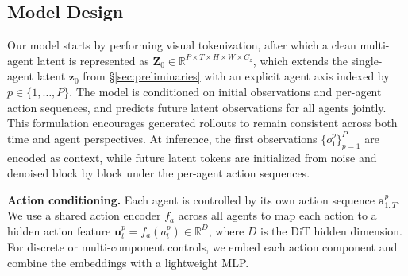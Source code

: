 


\subsection{Model Design}
\label{sec:model-design}

Our model starts by performing visual tokenization, after which a clean multi-agent latent is represented as
$\mathbf{Z}_0\in\mathbb{R}^{P\times T\times H\times W\times C_z}$,
which extends the single-agent latent $\mathbf{z}_0$ from \S\ref{sec:preliminaries} with an explicit agent axis indexed by $p\in\{1,\ldots,P\}$.
The model is conditioned on initial observations and per-agent action sequences, and predicts future latent observations for all agents jointly.
This formulation encourages generated rollouts to remain consistent across both time and agent perspectives.
At inference, the first observations $\{o_1^p\}_{p=1}^P$ are encoded as context, while future latent tokens are initialized from noise and denoised block by block under the per-agent action sequences.


\noindent\textbf{Action conditioning.}
\label{sec:action-conditioning}
Each agent is controlled by its own action sequence $\mathbf{a}^p_{1:T}$.
We use a shared action encoder $f_a$ across all agents to map each action to a hidden action feature
$\mathbf{u}_t^p = f_a(a_t^p) \in \mathbb{R}^{D}$,
where $D$ is the DiT hidden dimension.
For discrete or multi-component controls, we embed each action component and combine the embeddings with a lightweight MLP.

